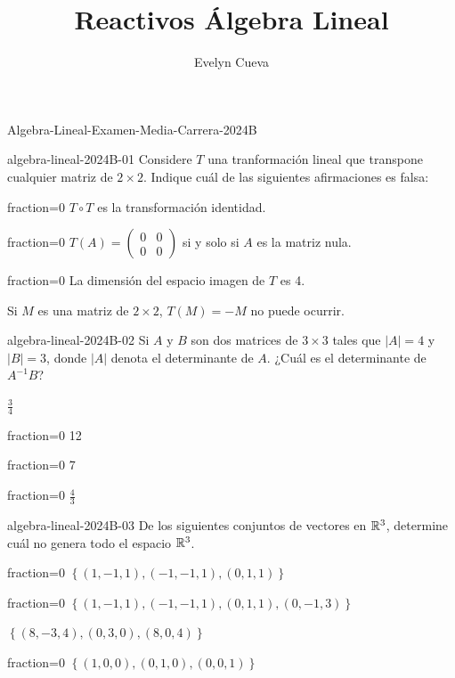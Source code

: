 \documentclass[10pt]{article}
\title{Reactivos Álgebra Lineal}
\author{Evelyn Cueva}
\begin{document}
\maketitle

\begin{quiz}{Algebra-Lineal-Examen-Media-Carrera-2024B}


\begin{multi}{algebra-lineal-2024B-01}
    Considere $T$ una tranformaci\'on lineal que transpone cualquier matriz de $2\times 2.$
    Indique cu\'al de las siguientes afirmaciones es falsa:
    \item[fraction=0] $T\circ T$ es la transformaci\'on identidad. 
    \item[fraction=0] $T(A)=\begin{pmatrix}
        0&0\\
        0&0
    \end{pmatrix}$ si y solo si $A$ es la matriz nula.
    \item[fraction=0] La dimensión del espacio imagen de $T$ es 4. 
    \item* Si $M$ es una matriz de $2\times 2$, $T(M)=-M$ no puede ocurrir. 
\end{multi}




\begin{multi}{algebra-lineal-2024B-02}
Si $A$ y $B$ son dos matrices de $3\times 3$ tales que $|A| = 4$ y $|B|=3$, donde $|A|$ denota el determinante de $A$. ¿Cu\'al es el determinante de $A^{-1}B$?
     \item* $\frac 34$
     \item[fraction=0]  12
     \item[fraction=0] 7
     \item[fraction=0] $\frac 43$
\end{multi}


\begin{multi}{algebra-lineal-2024B-03}
De los siguientes conjuntos de vectores en $\mathbb{R}^3$, determine cu\'al no genera todo el espacio $\mathbb{R}^3$.
    \item[fraction=0]  $\left\lbrace(1,-1,1),(-1,-1,1),(0,1,1)\right\rbrace$
    \item[fraction=0]  $\left\lbrace (1,-1,1),(-1,-1,1),(0,1,1),(0,-1,3) \right\rbrace$
    \item*  $\left\lbrace(8,-3,4),(0,3,0),(8,0,4)\right\rbrace$
    \item[fraction=0] $\left\lbrace (1,0,0),(0,1,0),(0,0,1) \right\rbrace$
\end{multi}


\end{quiz}
\end{document}
